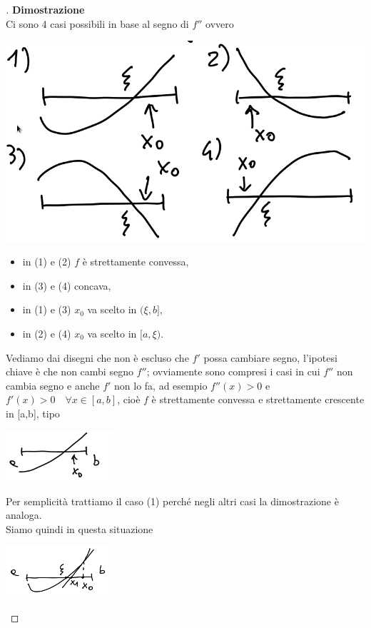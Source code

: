 \documentclass[12pt]{article}
\begin{document}
\begin{proof}[\unskip\nopunct]
\textbf{Dimostrazione}\\
Ci sono 4 casi possibili in base al segno di $f''$ ovvero
\begin{center}
    \includegraphics[scale=0.4]{pagina11_1.png}
\end{center}
\begin{itemize}
    \item in (1) e (2) $f$ è strettamente convessa,
    \item in (3) e (4) concava,
    \item in (1) e (3) $x_0$ va scelto in $(\xi,b]$,
    \item in (2) e (4) $x_0 $ va scelto in $[a,\xi)$.
\end{itemize}
Vediamo dai disegni che non è escluso che $f'$ possa cambiare segno, l'ipotesi chiave è che non cambi segno $f''$; ovviamente sono compresi i casi in cui $f''$ non cambia segno e anche $f'$ non lo fa, ad esempio $f''(x) > 0$ e $f'(x) > 0 \quad \forall x \in [a,b]$, cioè $f$ è strettamente convessa e strettamente crescente in [a,b], tipo\\
\begin{center}
\includegraphics[width=0.3\textwidth]{pagina12_1.PNG}
\end{center}
Per semplicità trattiamo il caso (1) perché negli altri casi la dimostrazione è analoga. \\
Siamo quindi in questa situazione\\
\begin{center}
\includegraphics[width=0.3\textwidth]{pagina12_2.PNG}

\end{center}
\end{proof}
\end{document}

